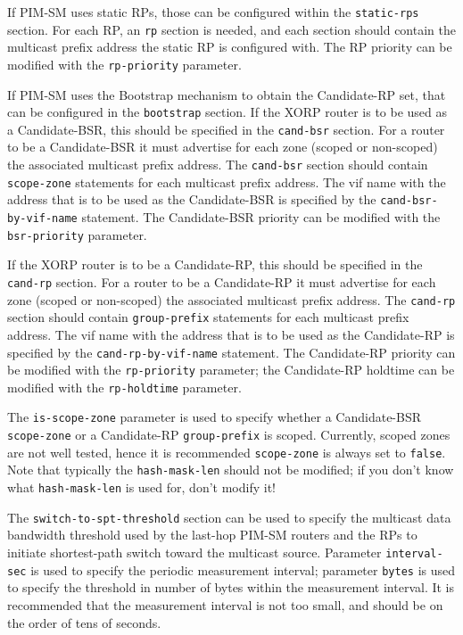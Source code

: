 \documentclass[11pt]{article}
\begin{document}
If PIM-SM uses static RPs, those can be configured within the
{\tt static-rps} section. For each RP, an {\tt rp} section is needed, and each
section should contain the multicast prefix address the static RP is
configured with. The RP priority can be modified with the {\tt rp-priority}
parameter.

If PIM-SM uses the Bootstrap mechanism to obtain the Candidate-RP set,
that can be configured in the {\tt bootstrap} section.
If the XORP router is to be used as a Candidate-BSR, this should be
specified in the {\tt cand-bsr} section.
For a router to be a Candidate-BSR it must advertise for
each zone (scoped or non-scoped) the associated multicast prefix address.
The {\tt cand-bsr} section should contain {\tt scope-zone} statements for each
multicast prefix address.
The vif name with the address that is to be used as the Candidate-BSR
is specified by the {\tt cand-bsr-by-vif-name} statement.
The Candidate-BSR priority can be modified with the {\tt bsr-priority}
parameter.

If the XORP router is to be a Candidate-RP, this should be specified
in the {\tt cand-rp} section.
For a router to be a Candidate-RP it must advertise for
each zone (scoped or non-scoped) the associated multicast prefix address.
The {\tt cand-rp} section should contain {\tt group-prefix} statements
for each multicast prefix address.
The vif name with the address that is to be used as the Candidate-RP
is specified by the {\tt cand-rp-by-vif-name} statement.
The Candidate-RP priority can be modified with the
{\tt rp-priority} parameter; the Candidate-RP holdtime can be modified
with the {\tt rp-holdtime} parameter.

The {\tt is-scope-zone} parameter is used to specify whether a
Candidate-BSR {\tt scope-zone} or a Candidate-RP {\tt group-prefix} is
scoped. Currently, 
scoped zones are not well tested, hence it is recommended {\tt scope-zone}
is always set to {\tt false}.
Note that typically the {\tt hash-mask-len} should not be modified; if you
don't know what {\tt hash-mask-len} is used for, don't modify it!

The {\tt switch-to-spt-threshold} section can be used to specify the
multicast data bandwidth threshold used by the last-hop PIM-SM routers
and the RPs to initiate shortest-path switch toward the multicast source.
Parameter {\tt interval-sec} is used to specify the periodic measurement
interval;
parameter {\tt bytes} is used to specify the threshold in number of bytes
within the measurement interval. It is recommended that the measurement
interval is not too small, and should be on the order of tens of seconds.
\end{document}
